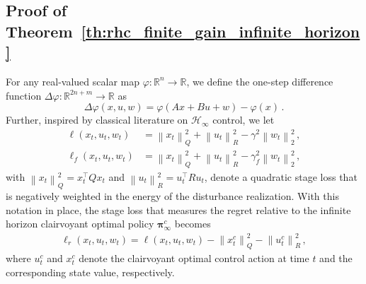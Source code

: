\documentclass[conference]{IEEEtran}
\newcommand{\norm}[1]{\left\lVert#1\right\rVert}
\begin{document}
\subsection{Proof of Theorem~\ref{th:rhc_finite_gain_infinite_horizon}}
\label{app:proof_rhc_finite_gain_infinite_horizon}
    For any real-valued scalar map $\varphi : \mathbb{R}^n \to \mathbb{R}$, we define the one-step difference function $\Delta \varphi : \mathbb{R}^{2n+m} \to \mathbb{R}$ as
    \begin{equation*}
        \Delta \varphi (x, u, w) = \varphi (Ax + Bu + w) - \varphi(x)\,.
    \end{equation*}
    Further, inspired by classical literature on $\mathcal{H}_\infty$ control, we let%
    \begin{align*}
        \ell(x_t, u_t, w_t) &= \norm{x_t}_Q^2 + \norm{u_t}_R^2 - \gamma^2\norm{w_t}_2^2\,,\\
        \ell_f(x_t, u_t, w_t) &= \norm{x_t}_Q^2 + \norm{u_t}_R^2 - \gamma_f^2\norm{w_t}_2^2\,,
    \end{align*}
    with $\norm{x_t}_Q^2 = x_t^\top Q x_t$ and $\norm{u_t}_R^2 = u_t^\top R u_t$, denote a quadratic stage loss that is negatively weighted in the energy of the disturbance realization. With this notation in place, the stage loss that measures the regret relative to the infinite horizon clairvoyant optimal policy $\bm{\pi}_\infty^c$ becomes
    \begin{align}
        \label{eq:lr_definition}
        \ell_r(x_t, u_t, w_t) = \ell(x_t, u_t, w_t)
        - \norm{x_t^c}^2_Q - \norm{u_t^c}^2_R\,,
    \end{align}
    where $u_t^c$ and $x_t^c$ denote the clairvoyant optimal control action at time $t$ and the corresponding state value, respectively.
\end{document}
